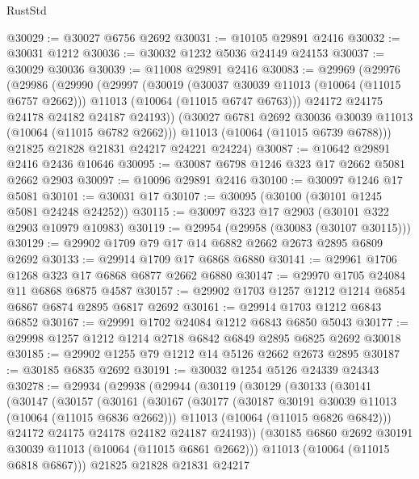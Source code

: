 \begin{lexlean}{RustStd}
\begin{coremodule}
@30029 := @30027 @6756 @2692
@30031 := @10105 @29891 @2416
@30032 := @30031 @1212
@30036 := @30032 @1232 @5036 @24149 @24153
@30037 := @30029 @30036
@30039 := @11008 @29891 @2416
@30083 := @29969
    (@29976
      (@29986
        (@29990
          (@29997
            (@30019
              (@30037 @30039 @11013 (@10064 (@11015 @6757 @2662)))
              @11013
              (@10064 (@11015 @6747 @6763)))
            @24172
            @24175
            @24178
            @24182
            @24187
            @24193))
        (@30027 @6781 @2692 @30036 @30039 @11013 (@10064 (@11015 @6782 @2662)))
        @11013
        (@10064 (@11015 @6739 @6788)))
      @21825
      @21828
      @21831
      @24217
      @24221
      @24224)
@30087 := @10642 @29891 @2416 @2436 @10646
@30095 := @30087 @6798 @1246 @323 @17 @2662 @5081 @2662 @2903
@30097 := @10096 @29891 @2416
@30100 := @30097 @1246 @17 @5081
@30101 := @30031 @17
@30107 := @30095 (@30100 (@30101 @1245 @5081 @24248 @24252))
@30115 := @30097 @323 @17 @2903 (@30101 @322 @2903 @10979 @10983)
@30119 := @29954 (@29958 (@30083 (@30107 @30115)))
@30129 := @29902 @1709 @79 @17 @14 @6882 @2662 @2673 @2895 @6809 @2692
@30133 := @29914 @1709 @17 @6868 @6880
@30141 := @29961 @1706 @1268 @323 @17 @6868 @6877 @2662 @6880
@30147 := @29970 @1705 @24084 @11 @6868 @6875 @4587
@30157 := @29902 @1703 @1257 @1212 @1214 @6854 @6867 @6874 @2895 @6817 @2692
@30161 := @29914 @1703 @1212 @6843 @6852
@30167 := @29991 @1702 @24084 @1212 @6843 @6850 @5043
@30177 := @29998 @1257 @1212 @1214 @2718 @6842 @6849 @2895 @6825 @2692 @30018
@30185 := @29902 @1255 @79 @1212 @14 @5126 @2662 @2673 @2895
@30187 := @30185 @6835 @2692
@30191 := @30032 @1254 @5126 @24339 @24343
@30278 := @29934
    (@29938
      (@29944
        (@30119
          (@30129
            (@30133
              (@30141
                (@30147
                  (@30157
                    (@30161
                      (@30167
                        (@30177
                          (@30187 @30191 @30039 @11013 (@10064 (@11015 @6836 @2662)))
                          @11013
                          (@10064 (@11015 @6826 @6842)))
                        @24172
                        @24175
                        @24178
                        @24182
                        @24187
                        @24193))
                    (@30185 @6860 @2692 @30191 @30039 @11013 (@10064 (@11015 @6861 @2662)))
                    @11013
                    (@10064 (@11015 @6818 @6867)))
                  @21825
                  @21828
                  @21831
                  @24217

\end{coremodule}
\end{lexlean}
